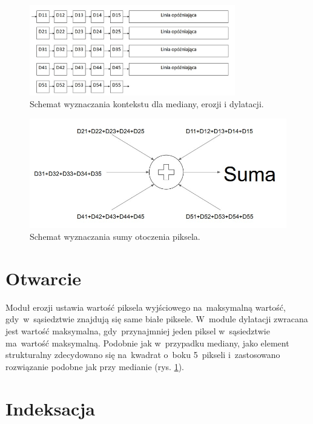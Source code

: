 \begin{figure}[h]
	\centering
	\includegraphics[width=0.8\textwidth]{kontekst.jpg}
	\caption{Schemat wyznaczania kontekstu dla mediany, erozji i dylatacji.}
	\label{fig:kontekst}
\end{figure}  

\begin{figure}[h]
	\centering
	\includegraphics[width=\textwidth]{drzewo_sumacyjne.jpg}
	\caption{Schemat wyznaczania sumy otoczenia piksela.}
	\label{fig:drzewo_sumacyjne}
\end{figure}  

\section{Otwarcie}
\label{subsec:erozja}

Moduł erozji ustawia wartość piksela wyjściowego na~maksymalną wartość, gdy~w~sąsiedztwie znajdują się same białe piksele. 
W~module dylatacji zwracana jest wartość maksymalna, gdy~przynajmniej jeden piksel w~sąsiedztwie ma~wartość maksymalną.
Podobnie jak w~przypadku mediany, jako element strukturalny zdecydowano się na~kwadrat o~boku 5~pikseli i~zastosowano rozwiązanie podobne jak przy medianie (rys. \ref{fig:kontekst}).



\section{Indeksacja}
\label{subsec:indeksacja}

